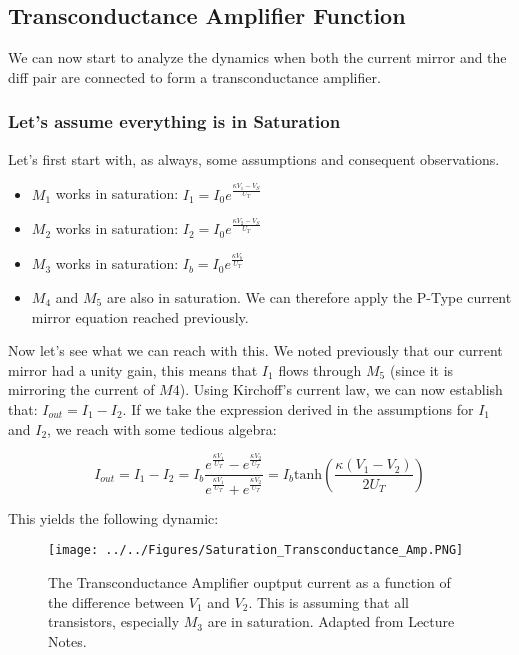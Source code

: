 \subsection{Transconductance Amplifier Function}

We can now start to analyze the dynamics when both the current mirror and the diff pair are connected to form a transconductance amplifier.

\subsubsection{Let's assume everything is in Saturation}

Let's first start with, as always, some assumptions and consequent observations. 
\begin{itemize}
    \item $M_1$ works in saturation: $I_1 = I_0 e^{\frac{\kappa V_1 - V_S}{U_T}}$
    \item $M_2$ works in saturation: $I_2 = I_0 e^{\frac{\kappa V_2 - V_S}{U_T}}$
    \item $M_3$ works in saturation: $I_b = I_0 e^{\frac{\kappa V_b}{U_T}}$
    \item $M_4$ and $M_5$ are also in saturation. We can therefore apply the P-Type current mirror equation reached previously. 
\end{itemize}

Now let's see what we can reach with this. We noted previously that our current mirror had a unity gain, this means that $I_1$ flows through $M_5$ (since it is mirroring the current of $M4$). Using Kirchoff's current law, we can now establish that: $I_{out} = I_1 - I_2$. If we take the expression derived in the assumptions for $I_1$ and $I_2$, we reach with some tedious algebra: 

\begin{equation}
    I_{out} = I_1 - I_2 = I_b\frac{e^{\frac{\kappa V_1}{U_T}} - e^{\frac{\kappa V_2}{U_T}}}{e^{\frac{\kappa V_1}{U_T}} + e^{\frac{\kappa V_2}{U_T}}} = I_b \mathrm{tanh}(\frac{\kappa (V_1 - V_2)}{2U_T}) 
\end{equation}

This yields the following dynamic: 

\begin{figure}[H]
    \centering
    \texttt{[image: ../../Figures/Saturation\_Transconductance\_Amp.PNG]}
    \caption{The Transconductance Amplifier ouptput current as a function of the difference between $V_1$ and $V_2$. This is assuming that all transistors, especially $M_3$ are in saturation. Adapted from Lecture Notes.}
    \label{fig:_saturated_transconductance_amplifier}
\end{figure}

